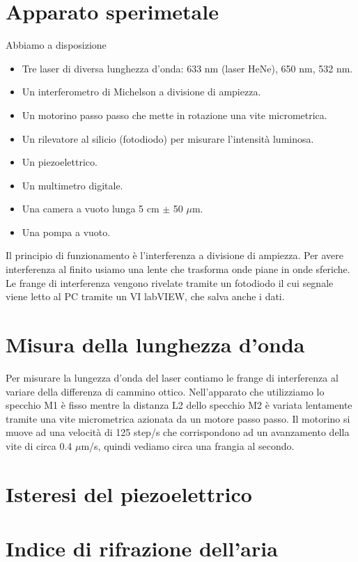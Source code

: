 \documentclass[a4paper]{article}
\begin{document}
\section{Apparato sperimetale}

	Abbiamo a disposizione 
	\begin{itemize}
		\item Tre laser di diversa lunghezza d'onda: 633 nm (laser HeNe), 650 nm, 532 nm.
		\item Un interferometro di Michelson a divisione di ampiezza.
		\item Un motorino passo passo che mette in rotazione una vite micrometrica.
		\item Un rilevatore al silicio (fotodiodo) per misurare l'intensità luminosa.
		\item Un piezoelettrico.
		\item Un multimetro digitale.
		\item Una camera a vuoto lunga 5 cm $\pm$ 50 $\mu$m.
		\item Una pompa a vuoto.
	\end{itemize}
Il principio di funzionamento è l'interferenza a divisione di ampiezza. Per avere interferenza al finito usiamo una lente che trasforma onde piane in onde sferiche. Le frange di interferenza vengono rivelate tramite un fotodiodo il cui segnale viene letto al PC tramite un VI labVIEW, che salva anche i dati.

\section{Misura della lunghezza d'onda}
Per misurare la lungezza d'onda del laser contiamo le frange di interferenza al variare della differenza di cammino ottico. Nell'apparato che utilizziamo lo specchio M1 è fisso mentre la distanza L2 dello specchio M2 è variata lentamente tramite una vite micrometrica azionata da un motore passo passo.
Il motorino si muove ad una velocità di 125 step/s che corrispondono ad un avanzamento della vite di circa 0.4 $\mu$m/s, quindi vediamo circa una frangia al secondo.

\section{Isteresi del piezoelettrico}

\section{Indice di rifrazione dell'aria}
\end{document}
